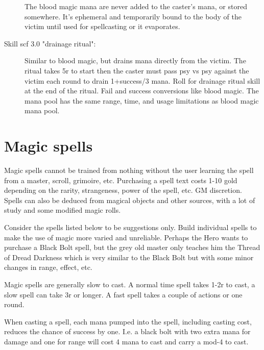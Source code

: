 \begin{description}
The blood magic mana are never added to the caster's mana, or stored somewhere. It's ephemeral and temporarily bound to the body of the victim until used for spellcasting or it evaporates.


\item[Skill scf 3.0 "drainage ritual":] Similar to blood magic, but drains mana directly from the victim. The ritual takes 5r to start then the caster must pass psy vs psy against the victim each round to drain 1+success/3 mana.
Roll for drainage ritual skill at the end of the ritual. Fail and success conversions like blood magic. The mana pool has the same range, time, and usage limitations as blood magic mana pool.


\end{description}







\section*{Magic spells}
Magic spells cannot be trained from nothing without the user learning the spell from a master, scroll, grimoire, etc. Purchasing a spell text costs 1-10 gold depending on the rarity, strangeness, power of the spell, etc. GM discretion.
Spells can also be deduced from magical objects and other sources, with a lot of study and some modified magic rolls.

Consider the spells listed below to be suggestions only. Build individual spells to make the use of magic more varied and unreliable. Perhaps the Hero wants to purchase a Black Bolt spell, but the grey old master only teaches him the Thread of Dread Darkness which is very similar to the Black Bolt but with some minor changes in range, effect, etc.

Magic spells are generally slow to cast. A normal time spell takes 1-2r to cast, a slow spell can take 3r or longer. A fast spell takes a couple of actions or one round.

When casting a spell, each mana pumped into the spell, including casting cost, reduces the chance of success by one. I.e. a black bolt with two extra mana for damage and one for range will cost 4 mana to cast and carry a mod-4 to cast.

